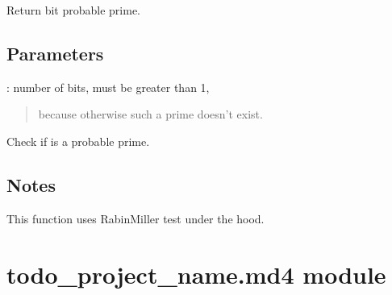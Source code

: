 \documentclass[letterpaper,10pt,english]{sphinxmanual}
\begin{document}
\begin{fulllineitems}
\label{\detokenize{todo_project_name:todo_project_name.find_prime.find_prime}}
\pysigstartsignatures
{}
\pysigstopsignatures
\sphinxAtStartPar
Return \sphinxhyphen{}bit probable prime.


\subsection{Parameters}
\label{\detokenize{todo_project_name:id2}}
\sphinxAtStartPar
{}
: number of bits, must be greater than 1,
\begin{quote}

\sphinxAtStartPar
because otherwise such a prime doesn’t exist.
\end{quote}

\end{fulllineitems}


\begin{fulllineitems}
\label{\detokenize{todo_project_name:todo_project_name.find_prime.is_probable_prime}}
\pysigstartsignatures
{}
\pysigstopsignatures
\sphinxAtStartPar
Check if  is a probable prime.


\subsection{Notes}
\label{\detokenize{todo_project_name:notes}}
\sphinxAtStartPar
This function uses Rabin\sphinxhyphen{}Miller test under the hood.

\end{fulllineitems}



\section{todo\_project\_name.md4 module}
\label{\detokenize{todo_project_name:module-todo_project_name.md4}}\label{\detokenize{todo_project_name:todo-project-name-md4-module}}
\end{document}
